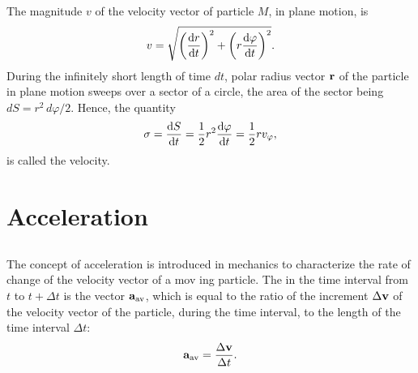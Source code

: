 The magnitude $v$ of the velocity vector of particle $M$, in plane motion, is
\begin{equation*}%
v = \sqrt{\left(\dv{r}{t} \right)^{2} + \left( r \dv{\varphi}{t} \right)^{2} }.
\end{equation*}
During the infinitely short length of time $dt$, polar radius vector $\vb{r}$ of the particle in plane motion sweeps over a sector of a circle, the area of the sector being $dS = r^{2} \,d\varphi/2$. Hence, the quantity
\begin{equation*}%
\sigma = \dv{S}{t} = \frac{1}{2}r^{2}\dv{\varphi}{t}=\frac{1}{2} r v_{\varphi},
\end{equation*}
is called the  velocity.

\section{Acceleration}
\label{sec-1.4}


\subsection{}\label{1.4.1} The concept of acceleration is introduced in mechanics to characterize the rate of change of the velocity vector of a mov­ ing particle. The  in the time interval from $t$ to $t + \Delta t$ is 	the vector $\vb{a_{\textrm{av}}}$, which is equal to the ratio of the increment $\Delta \vb{v}$ of the velocity vector of the particle, during the time interval, to the length of the time interval $\Delta t$:
\begin{equation*}%
\vb{a_{\textrm{av}}} = \frac{\Delta \vb{v}}{\Delta t}.
\end{equation*}

